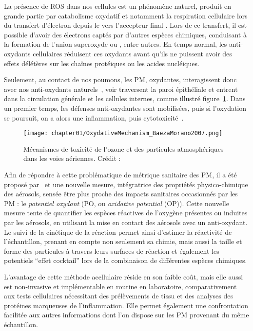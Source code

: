 La présence de ROS dans nos cellules est un phénomène naturel, produit en grande partie
par catabolisme oxydatif et notamment la respiration cellulaire lors du transfert
d'électron depuis le  vers l'accepteur final . Lors de ce transfert, il est
possible d'avoir des électrons captés par d'autres espèces chimiques, conduisant à la
formation de l'anion superoxyde  ou , entre autres.
En temps normal, les anti-oxydants cellulaires réduisent ces oxydants avant qu'ils ne
puissent avoir des effets délétères sur les chaînes protéiques ou les acides nucléiques.

Seulement, au contact de nos poumons, les PM, oxydantes, interagissent donc avec nos
anti-oxydants naturels~\autocite{kellyProtein2003}, voir traversent la paroi épithéliale
et entrent dans la circulation générale et les cellules internes, comme illustré
figure~\ref{fig:mecanisme_oxydation}.
Dans un premier temps, les défenses anti-oxydantes sont mobilisées, puis si l'oxydation se
poursuit, on a alors une inflammation, puis cytotoxicité~\autocite{baezaPollution2007}.

\begin{figure}[ht]
    \centering
    \texttt{[image: chapter01/OxydativeMechanism\_BaezaMorano2007.png]}
    \caption{Mécanismes de toxicité de l’ozone et des particules atmosphériques dans les voies
    aériennes. Crédit : \cite[figure 1]{baezaPollution2007}}%
    \label{fig:mecanisme_oxydation}
\end{figure}

Afin de répondre à cette problématique de métrique sanitaire des PM, il a été proposé
par~\cite{zielinskiModeling1999} et \cite{choRedox2005} une nouvelle mesure, intégratrice
des propriétés physico-chimique des aérosols, sensée être plus proche des impacts
sanitaires occasionnés par les PM : le \textit{potentiel oxydant} (PO, ou
\textit{oxidative potential} (OP)).  Cette nouvelle mesure tente de quantifier les espèces
réactives de l'oxygène présentes ou induites par les aérosols, en utilisant la mise en
contact des aérosols avec un anti-oxydant.  Le suivi de la cinétique de la réaction permet
ainsi d'estimer la réactivité de l'échantillon, prenant en compte non seulement sa chimie,
mais aussi la taille et forme des particules à travers leurs surfaces de réaction et
également les potentiels ``effet cocktail'' lors de la combinaison de différentes espèces
chimiques.

L'avantage de cette méthode acellulaire réside en son faible coût, mais elle aussi est
non-invasive et implémentable en routine en laboratoire, comparativement aux tests
cellulaires nécessitant des prélèvements de tissu et des analyses des protéines marqueuses de
l'inflammation.  Elle permet également une confrontation facilitée aux autres informations
dont l'on dispose sur les PM provenant du même échantillon.

